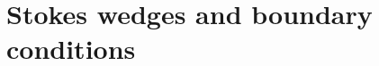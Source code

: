 \documentclass[12pt, a4paper]{report}
\newcommand\PT{\(\mathcal{PT}\)}
\begin{document}
\section*{Stokes wedges and boundary conditions}\label{}





\end{document}
